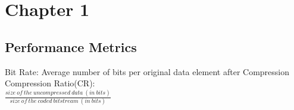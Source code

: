 \section{Chapter 1}
\subsection*{Performance Metrics}
Bit Rate: Average number of bits per original data element after Compression\\
Compression Ratio(CR):\\
$\frac{size\ of\ the\ uncompressed\ data\ (in\ bits)}{size\ of\ the\ coded\ bitstream\ (in\ bits)}$